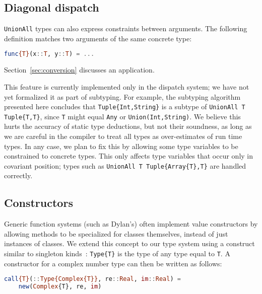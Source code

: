 \subsection{Diagonal dispatch}
\label{sec:diagonal}

\texttt{UnionAll} types can also express constraints between arguments.
The following definition matches two arguments of the same concrete
type:

\begin{singlespace}
\begin{lstlisting}[language=julia]
func{T}(x::T, y::T) = ...
\end{lstlisting}
\end{singlespace}

\noindent
Section~\ref{sec:conversion} discusses an application.

This feature is currently implemented only in the dispatch system;
we have not yet formalized it as part of subtyping.
For example, the subtyping algorithm presented here concludes that
\texttt{Tuple\{Int,String\}} is a subtype of
\texttt{UnionAll T Tuple\{T,T\}}, since \texttt{T} might equal
\texttt{Any} or \texttt{Union(Int,String)}.
We believe this hurts the accuracy of static type deductions, but
not their soundness, as long as we are careful in the compiler to
treat all types as over-estimates of run time types.
In any case, we plan to fix this by allowing some type variables
to be constrained to concrete types.
This only affects type variables that occur only in covariant
position; types such as \texttt{UnionAll T Tuple\{Array\{T\},T\}}
are handled correctly.

\subsection{Constructors}
\label{sec:constructors}

Generic function systems (such as Dylan's) often implement value
constructors by allowing methods to be specialized for classes
themselves, instead of just instances of classes.
We extend this concept to our type system using a construct similar
to singleton kinds~\cite{Stone:2000:DTE:325694.325724}:
\texttt{Type\{T\}} is the type of any type equal to \texttt{T}.
A constructor for a complex number type can then be written as follows:

\begin{singlespace}
\begin{lstlisting}[language=julia]
call{T}(::Type{Complex{T}}, re::Real, im::Real) =
    new(Complex{T}, re, im)
\end{lstlisting}
\end{singlespace}

